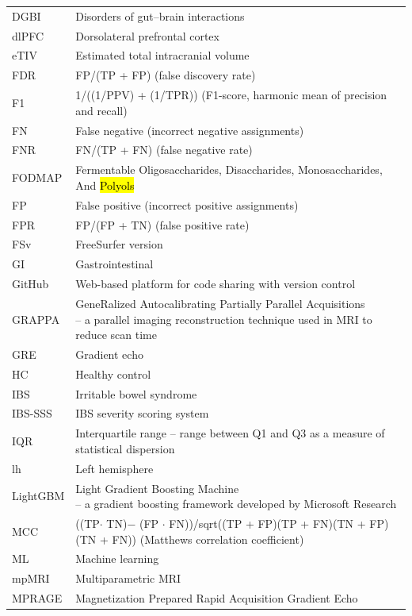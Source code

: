 \documentclass[diagnostics,article,accept,pdftex,moreauthors]{Definitions/mdpi}
\begin{document}
{\begin{tabular}{@{}ll}
DGBI & Disorders of gut--brain interactions\\
dlPFC & Dorsolateral prefrontal cortex \\
eTIV  & Estimated total intracranial volume\\
FDR & FP/(TP + FP) (false discovery rate)\\ 
F1 & 1/((1/PPV) + (1/TPR)) (F1-score, harmonic mean of precision and recall)\\
FN & False negative (incorrect negative assignments) \\
FNR & FN/(TP + FN) (false negative rate)\\
FODMAP & Fermentable Oligosaccharides, Disaccharides, Monosaccharides, And \hl{Polyols}\\ %
FP & False positive (incorrect positive assignments) \\
FPR & FP/(FP + TN) (false positive rate)\\
FSv & FreeSurfer version\\
GI & Gastrointestinal\\
GitHub & Web-based platform for code sharing with version control\\
GRAPPA & \makecell[l]{GeneRalized Autocalibrating Partially Parallel Acquisitions \\
  -- a parallel imaging reconstruction technique used in MRI to reduce scan time}\\ %
GRE & Gradient echo\\
HC & Healthy control \\
IBS & Irritable bowel syndrome\\
IBS-SSS & IBS severity scoring system\\
IQR & Interquartile range -- range between Q1 and Q3 as a measure of statistical dispersion \\
lh & Left hemisphere \\
LightGBM & \makecell[l]{Light Gradient Boosting Machine \\
-- a gradient boosting framework developed by Microsoft Research}\\
MCC & \makecell[l]{((TP$\cdot$ TN)$-$ (FP $\cdot$ FN))/sqrt((TP + FP)(TP + FN)(TN + FP)(TN + FN))\\(Matthews correlation coefficient)}  \\
ML & Machine learning \\
mpMRI & Multiparametric MRI\\
MPRAGE & \makecell[l]{Magnetization Prepared Rapid Acquisition Gradient Echo\\
}
\end{tabular}}
\end{document}

